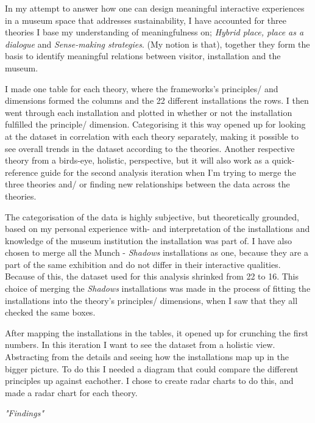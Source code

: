 In my attempt to answer how one can design meaningful interactive experiences in a museum space that addresses sustainability, I have accounted for three theories I base my understanding of meaningfulness on; \emph{Hybrid place, place as a dialogue} and \emph{Sense-making strategies}. (My notion is that), together they form the basis to identify meaningful relations between visitor, installation and the museum. 


I made one table for each theory, where the frameworks's principles/ and dimensions formed the columns and the 22 different installations the rows. I then went through each installation and plotted in whether or not the installation fulfilled the principle/ dimension. Categorising it this way opened up for looking at the dataset in correlation with each theory separately, making it possible to see overall trends in the dataset according to the theories. Another respective theory from a birds-eye, holistic, perspective, but it will also work as a quick-reference guide for the second analysis iteration when I'm trying to merge the three theories and/ or finding new relationships between the data across the theories.

The categorisation of the data is highly subjective, but theoretically grounded, based on my personal experience with- and interpretation of the installations and knowledge of the museum institution the installation was part of. I have also chosen to merge all the Munch - \emph{Shadows} installations as one, because they are a part of the same exhibition and do not differ in their interactive qualities. Because of this, the dataset used for this analysis shrinked from 22 to 16. This choice of merging the \emph{Shadows} installations was made in the process of fitting the installations into the theory's principles/ dimensions, when I saw that they all checked the same boxes. 


After mapping the installations in the tables, it opened up for crunching the first numbers. In this iteration I want to see the dataset from a holistic view. Abstracting from the details and seeing how the installations map up in the bigger picture. To do this I needed a diagram that could compare the different principles up against eachother. I chose to create radar charts to do this, and made a radar chart for each theory. 


\emph{"Findings"}
\par

